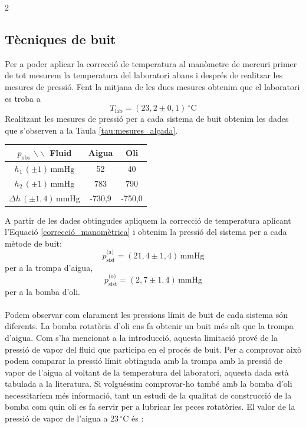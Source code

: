 \documentclass[12pt,twosides,onecolumn,openany]{article}
\newenvironment{Figura}
  {\par\medskip\noindent\minipage{\linewidth}}
  {\endminipage\par\medskip}
\begin{document}
\begin{multicols}{2}
\subsection{Tècniques de buit}
Per a poder aplicar la correcció de temperatura al manòmetre de mercuri primer de tot mesurem la temperatura del laboratori abans i després de realitzar les mesures de pressió. Fent la mitjana de les dues mesures obtenim que el laboratori es troba a
\begin{equation*}
    T_{\text{lab}} = (23,2\pm0,1)\, ^\circ\text{C}
\end{equation*}
Realitzant les mesures de pressió per a cada sistema de buit obtenim les dades que s'observen a la Taula \ref{tau:mesures_alçada}.
\renewcommand{\arraystretch}{1.6}
\begin{Figura}
    \centering
    \begin{tabular}{c|c|c}
        $p_{\text{obs}}$ $\backslash\backslash$ Fluid  & \multirow{1}{1.6cm}{\centering Aigua} & \multirow{1}{1.6cm}{\centering Oli} \\
        \hline\hline
        \(h_{1}\,(\pm 1) \, \text{mmHg}\) & 52 & 40 \\
        \(h_{2}\,(\pm 1) \, \text{mmHg}\) & 783 & 790 \\
        \hline
        \( \Delta h \, (\pm 1,4) \, \text{mmHg}\) & -730,9 & -750,0
    \end{tabular}
    \label{tau:mesures_alçada}
\end{Figura}
A partir de les dades obtingudes apliquem la correcció de temperatura aplicant l'Equació \eqref{correcció_manomètrica} i obtenim la pressió del sistema per a cada mètode de buit:
\begin{equation*}
    p_{\text{sist}}^{\text{(a)}} = (21,4\pm1,4)\, \text{mmHg}
\end{equation*}
per a la trompa d'aigua,
\begin{equation*}
    p_{\text{sist}}^{\text{(o)}} = (2,7\pm1,4)\, \text{mmHg}
\end{equation*}
per a la bomba d'oli.\\\\
Podem observar com clarament les pressions límit de buit de cada sistema són diferents. La bomba rotatòria d'oli ens fa obtenir un buit més alt que la trompa d'aigua. Com s'ha mencionat a la introducció, aquesta limitació prové de la pressió de vapor del fluid que participa en el procés de buit. Per a comprovar això podem comparar la pressió límit obtinguda amb la trompa amb la pressió de vapor de l'aigua al voltant de la temperatura del laboratori, aquesta dada està tabulada a la literatura. Si volguéssim comprovar-ho també amb la bomba d'oli necessitaríem més informació, tant un estudi de la qualitat de construcció de la bomba com quin oli es fa servir per a lubricar les peces rotatòries. El valor de la pressió de vapor de l'aigua a \(23\,^\circ\text{C}\) és \cite{llibre_lab}:

\end{multicols}
\end{document}
